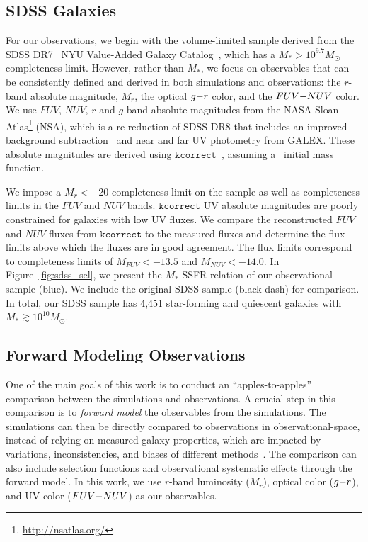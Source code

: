 \subsection{SDSS Galaxies} \label{sec:obs} 
For our observations, we 
begin with the volume-limited \cite{tinker2011} sample derived from the SDSS
DR7~\citep{abazajian2009} NYU Value-Added Galaxy
Catalog~\citep[VAGC;][]{blanton2005}, which has a $M_* > 10^{9.7} M_\odot$
completeness limit. 
However, rather than $M_*$, we focus on observables that can be consistently
defined and derived in both simulations and observations: the $r$-band absolute
magnitude, $M_r$, the optical $g{-}r$ color, and the $FUV{-}NUV$ color. 
We use $FUV$, $NUV$, $r$ and $g$ band absolute magnitudes from the NASA-Sloan
Atlas\footnote{\url{http://nsatlas.org/}} (NSA), which is a re-reduction of SDSS DR8
\citep{aihara2011} that includes an improved background subtraction~\citep{blanton2011} 
and near and far UV photometry from GALEX. These absolute magnitudes are
derived using $\mathtt{kcorrect}$~\citep{blanton2007a}, assuming
a~\cite{chabrier2003} initial mass function. 

We impose a $M_r < -20$ completeness limit on the \cite{tinker2011} sample as
well as completeness limits in the $FUV$ and $NUV$ bands. 
$\mathtt{kcorrect}$ UV absolute magnitudes are poorly constrained for
galaxies with low UV fluxes. 
We compare the reconstructed $FUV$ and $NUV$ fluxes from
$\mathtt{kcorrect}$ to the measured fluxes and determine the flux limits
above which the fluxes are in good agreement. 
The flux limits correspond to completeness limits of $M_{FUV} < -13.5$  and
$M_{NUV} < -14.0$. 
In Figure~\ref{fig:sdss_sel}, we present the $M_*$-SSFR relation of our
observational sample (blue). 
We include the original \cite{tinker2011} SDSS sample (black dash) for
comparison.  
In total, our SDSS sample has 4,451 star-forming and quiescent galaxies
with $M_* \gtrsim 10^{10}M_\odot$.

\subsection{Forward Modeling Observations} \label{sec:fm} 
One of the main goals of this work is to conduct an ``apples-to-apples''
comparison between the simulations and observations. 
A crucial step in this comparison is to \emph{forward model} the
observables from the simulations. 
The simulations can then be directly compared to observations in
observational-space, instead of relying on measured galaxy properties,
which are impacted by variations, inconsistencies, and biases of different
methods~\citep{dickey2020}. 
The comparison can also include selection functions and observational systematic
effects through the forward model. 
In this work, we use $r$-band luminosity ($M_r$), optical color ($g{-}r$),
and UV color ($FUV{-}NUV$) as our observables. 

